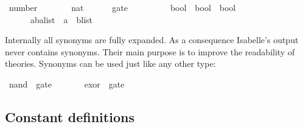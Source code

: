 %
\begin{isabellebody}%
\def\isabellecontext{types}%
\ number\ \ \ \ \ \ \ {\isacharequal}\ nat\isanewline
\ \ \ \ \ \ gate\ \ \ \ \ \ \ \ \ {\isacharequal}\ {\isachardoublequote}bool\ {\isasymRightarrow}\ bool\ {\isasymRightarrow}\ bool{\isachardoublequote}\isanewline
\ \ \ \ \ \ {\isacharparenleft}{\isacharprime}a{\isacharcomma}{\isacharprime}b{\isacharparenright}alist\ {\isacharequal}\ {\isachardoublequote}{\isacharparenleft}{\isacharprime}a\ {\isacharasterisk}\ {\isacharprime}b{\isacharparenright}list{\isachardoublequote}%
\begin{isamarkuptext}%
\noindent{}%
Internally all synonyms are fully expanded.  As a consequence Isabelle's
output never contains synonyms.  Their main purpose is to improve the
readability of theories.  Synonyms can be used just like any other
type:%
\end{isamarkuptext}%
\ nand\ {\isacharcolon}{\isacharcolon}\ gate\isanewline
\ \ \ \ \ \ \ exor\ {\isacharcolon}{\isacharcolon}\ gate%
\begin{isamarkuptext}%
\subsection{Constant definitions}
\label{sec:ConstDefinitions}


\end{isamarkuptext}
\end{isabellebody}
